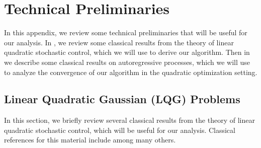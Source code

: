 \section{Technical Preliminaries}

In this appendix, we review some technical preliminaries that will be useful for our analysis.  In , we review some classical results from the theory of linear quadratic stochastic control, which we will use to derive our algorithm. Then in  we describe some classical results on autoregressive processes, which we will use to analyze the convergence of our algorithm in the quadratic optimization setting.



\subsection{Linear Quadratic Gaussian (LQG) Problems}\label{app:stoch_control}

In this section, we briefly review several classical results from the theory of linear quadratic stochastic control, which will be useful for our analysis.  Classical references for this material include \citet{kwakernaak1972linear,yong1999stochastic} among many others.

